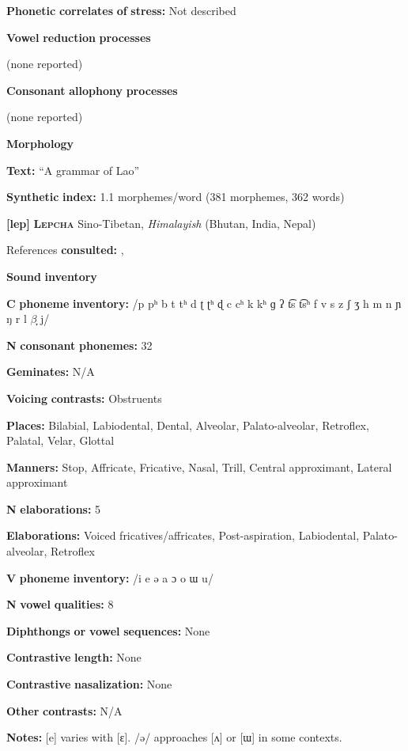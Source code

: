 \textbf{Phonetic} \textbf{correlates} \textbf{of} \textbf{stress:} Not described

\textbf{Vowel} \textbf{reduction} \textbf{processes}

(none reported)

\textbf{Consonant} \textbf{allophony} \textbf{processes}

(none reported)

\textbf{Morphology}

\textbf{Text:} “A grammar of Lao” \citep[488-497]{Enfield2007}

\textbf{Synthetic} \textbf{index:} 1.1 morphemes/word (381 morphemes, 362 words)

\textbf{[lep]}   \textbf{\textsc{Lepcha}}    Sino-Tibetan, \textit{Himalayish} (Bhutan, India, Nepal)

References \textbf{consulted:} \citet{Plaisier2007}, \citet{Sprigg1966}

\textbf{Sound} \textbf{inventory}

\textbf{C} \textbf{phoneme} \textbf{inventory:} /p pʰ b t tʰ d ʈ ʈʰ ɖ c cʰ k kʰ ɡ ʔ t͡s t͡sʰ f v s z ʃ ʒ h m n ɲ ŋ r l $\beta ̞$ j/

\textbf{N} \textbf{consonant} \textbf{phonemes:} 32

\textbf{Geminates:} N/A

\textbf{Voicing} \textbf{contrasts:} Obstruents

\textbf{Places:} Bilabial, Labiodental, Dental, Alveolar, Palato-alveolar, Retroflex, Palatal, Velar, Glottal

\textbf{Manners:} Stop, Affricate, Fricative, Nasal, Trill, Central approximant, Lateral approximant

\textbf{N} \textbf{elaborations:} 5

\textbf{Elaborations:} Voiced fricatives/affricates, Post-aspiration, Labiodental, Palato-alveolar, Retroflex

\textbf{V} \textbf{phoneme} \textbf{inventory:} /i e ə a ɔ o ɯ u/

\textbf{N} \textbf{vowel} \textbf{qualities:} 8

\textbf{Diphthongs} \textbf{or} \textbf{vowel} \textbf{sequences:} None

\textbf{Contrastive} \textbf{length:} None

\textbf{Contrastive} \textbf{nasalization:} None

\textbf{Other} \textbf{contrasts:} N/A

\textbf{Notes:} [e] varies with [ɛ]. /ə/ approaches [ʌ] or [ɯ] in some contexts.

